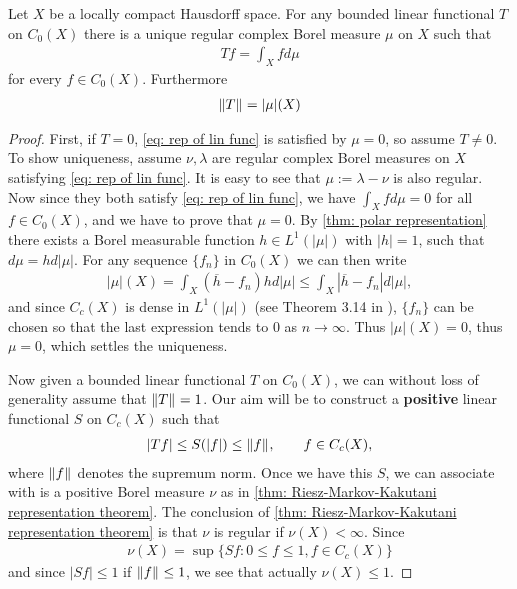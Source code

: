\begin{theorem}\label{thm: Riesz-markov}
Let $X$ be a locally compact Hausdorff space. For any bounded linear functional $T$ on $C_{0}(X)$ there is a unique regular complex Borel measure $\mu$ on $X$ such that
\begin{align}
	Tf=\int_{X}fd\mu \label{eq: rep of lin func}
\end{align}
for every $f\in C_{0}(X)$. Furthermore
\begin{align}
	\Vert{T}\Vert_{}=|\mu|(X) \label{eq: jadfhsadf}
\end{align}
\end{theorem}
\begin{proof}
First, if $T=0$, \eqref{eq: rep of lin func} is satisfied by $\mu=0$, so assume $T\neq 0$.
To show uniqueness, assume $\nu, \lambda$ are regular complex Borel measures on $X$ satisfying \eqref{eq: rep of lin func}. It is easy to see that $\mu:=\lambda-\nu$ is also regular. Now since they both satisfy \eqref{eq: rep of lin func}, we have $\int_{X}fd\mu=0$ for all $f\in C_{0}(X)$, and we have to prove that $\mu=0$. By \cref{thm: polar representation} there exists a Borel measurable function $h\in L^{1}(|\mu|)$ with $|h|=1$, such that $d\mu=hd|\mu|$. For any sequence $\{f_{n}\}$ in $C_{0}(X)$ we can then write
\begin{align*}
	|\mu|(X)=\int_{X}(\overline{h}-f_{n})hd|\mu|\le \int_{X}|\overline{h}-f_{n}|d|\mu|,
\end{align*}
and since $C_{c}(X)$ is dense in $L^{1}(|\mu|)$ (see Theorem 3.14 in \cite{Rudin87}), $\{f_{n}\}$ can be chosen so that the last expression tends to $0$ as $n\to \infty$. Thus $|\mu|(X)=0$, thus $\mu=0$, which settles the uniqueness.

Now given a bounded linear functional $T$ on $C_{0}(X)$, we can without loss of generality assume that $\Vert{T}\Vert_{}=1$. Our aim will be to construct a \textbf{positive} linear functional $S$ on $C_{c}(X)$ such that
\begin{align}
	|Tf| \le S(|f|)\le \Vert{f}\Vert_{}, \qquad f\in C_{c}(X), \label{eq: ineq of lin funcs}
\end{align}
where $\Vert{f}\Vert_{}$ denotes the supremum norm. Once we have this $S$, we can associate with is a positive Borel measure $\nu$ as in \cref{thm: Riesz-Markov-Kakutani representation theorem}. The conclusion of \cref{thm: Riesz-Markov-Kakutani representation theorem} is that $\nu$ is regular if $\nu(X)<\infty$. Since
\begin{align*}
	\nu(X)=\sup\{ Sf: 0 \le f \le 1,  f\in C_{c}(X) \}
\end{align*}
and since $|Sf| \le 1$ if $\Vert{f}\Vert_{} \le 1$, we see that actually $\nu(X)\le 1$.


\end{proof}
